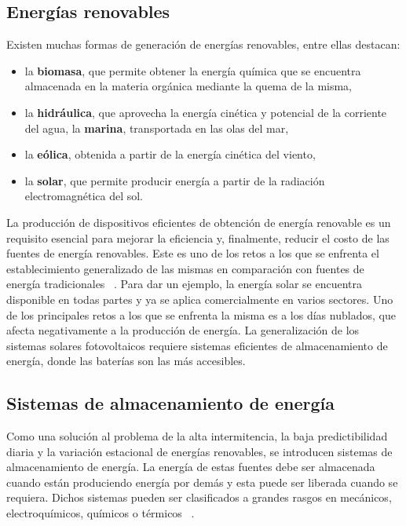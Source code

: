 \subsection{Energías renovables}

Existen muchas formas de generación de energías renovables, entre ellas destacan:
\begin{itemize}
    \item la \textbf{biomasa}, que permite obtener la energía química 
        que se encuentra almacenada en la materia orgánica mediante la quema de 
        la misma,
    \item la \textbf{hidráulica}, que aprovecha la energía cinética y potencial
        de la corriente del agua, la \textbf{marina}, transportada en las olas
        del mar,
    \item la \textbf{eólica}, obtenida a partir de la energía cinética del viento,
    \item la \textbf{solar}, que permite producir energía a partir de la radiación
        electromagnética del sol.
\end{itemize}
La producción de dispositivos eficientes de obtención de energía renovable es un 
requisito esencial para mejorar la eficiencia y, finalmente, reducir el costo de 
las fuentes de energía renovables. Este es uno de los retos a los que se 
enfrenta el establecimiento generalizado de las mismas en comparación con fuentes
de energía tradicionales ~\cite{olabi2022}. Para dar un ejemplo, la energía solar 
se encuentra disponible en todas partes y ya se aplica comercialmente en varios 
sectores. Uno de los principales retos a los que se enfrenta la misma es a los 
días nublados, que afecta negativamente a la producción de energía. La 
generalización de los sistemas solares fotovoltaicos requiere sistemas eficientes 
de almacenamiento de energía, donde las baterías son las más accesibles. 

\subsection{Sistemas de almacenamiento de energía}

Como una solución al problema de la alta intermitencia, la baja predictibilidad 
diaria y la variación estacional de energías renovables, se introducen sistemas 
de almacenamiento de energía. La energía de estas fuentes debe ser almacenada 
cuando están produciendo energía por demás y esta puede ser liberada cuando se 
requiera. Dichos sistemas pueden ser clasificados a grandes rasgos en mecánicos, 
electroquímicos, químicos o térmicos ~\cite{khan2019}.

